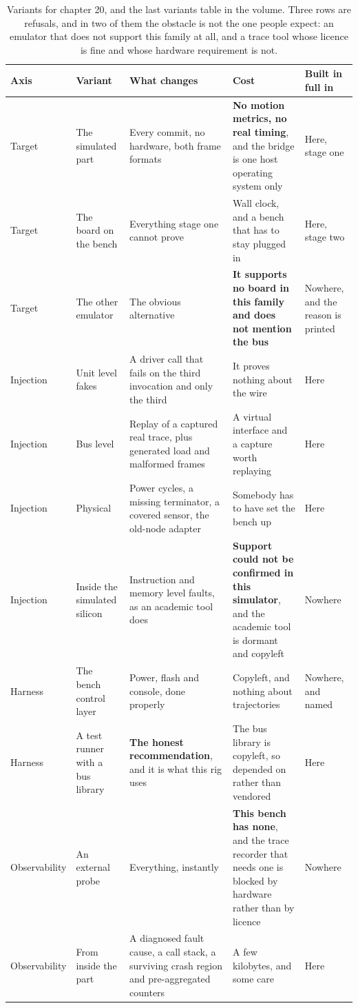 \begin{table}[H]\centering\small
\begin{tabular}{p{24mm}p{26mm}p{44mm}p{22mm}p{20mm}}
\toprule
Axis & Variant & What changes & Cost & Built in full in \\
\midrule
Target & The simulated part & Every commit, no hardware, both frame formats & \textbf{No motion metrics, no real timing}, and the bridge is one host operating system only & Here, stage one \\
Target & The board on the bench & Everything stage one cannot prove & Wall clock, and a bench that has to stay plugged in & Here, stage two \\
Target & The other emulator & The obvious alternative & \textbf{It supports no board in this family and does not mention the bus} & Nowhere, and the reason is printed \\
Injection & Unit level fakes & A driver call that fails on the third invocation and only the third & It proves nothing about the wire & Here \\
Injection & Bus level & Replay of a captured real trace, plus generated load and malformed frames & A virtual interface and a capture worth replaying & Here \\
Injection & Physical & Power cycles, a missing terminator, a covered sensor, the old-node adapter & Somebody has to have set the bench up & Here \\
Injection & Inside the simulated silicon & Instruction and memory level faults, as an academic tool does & \textbf{Support could not be confirmed in this simulator}, and the academic tool is dormant and copyleft & Nowhere \\
Harness & The bench control layer & Power, flash and console, done properly & Copyleft, and nothing about trajectories & Nowhere, and named \\
Harness & A test runner with a bus library & \textbf{The honest recommendation}, and it is what this rig uses & The bus library is copyleft, so depended on rather than vendored & Here \\
Observability & An external probe & Everything, instantly & \textbf{This bench has none}, and the trace recorder that needs one is blocked by hardware rather than by licence & Nowhere \\
Observability & From inside the part & A diagnosed fault cause, a call stack, a surviving crash region and pre-aggregated counters & A few kilobytes, and some care & Here \\
\bottomrule
\end{tabular}
\caption{Variants for chapter 20, and the last variants table in the volume. Three rows are refusals, and in two of them the obstacle is not the one people expect: an emulator that does not support this family at all, and a trace tool whose licence is fine and whose hardware requirement is not.}
\end{table}

